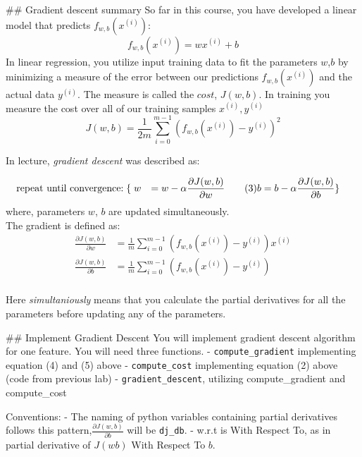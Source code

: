 \documentclass[11pt]{article}
\begin{document}
    \#\# Gradient descent summary So far in this course, you have developed
a linear model that predicts \(f_{w,b}(x^{(i)})\):
\[f_{w,b}(x^{(i)}) = wx^{(i)} + b \tag{1}\] In linear regression, you
utilize input training data to fit the parameters \(w\),\(b\) by
minimizing a measure of the error between our predictions
\(f_{w,b}(x^{(i)})\) and the actual data \(y^{(i)}\). The measure is
called the \(cost\), \(J(w,b)\). In training you measure the cost over
all of our training samples \(x^{(i)},y^{(i)}\)
\[J(w,b) = \frac{1}{2m} \sum\limits_{i = 0}^{m-1} (f_{w,b}(x^{(i)}) - y^{(i)})^2\tag{2}\]

    In lecture, \emph{gradient descent} was described as:

\[\begin{align*} \text{repeat}&\text{ until convergence:} \; \lbrace \newline
\;  w &= w -  \alpha \frac{\partial J(w,b)}{\partial w} \tag{3}  \; \newline 
 b &= b -  \alpha \frac{\partial J(w,b)}{\partial b}  \newline \rbrace
\end{align*}\] where, parameters \(w\), \(b\) are updated
simultaneously.\\
The gradient is defined as: \[
\begin{align}
\frac{\partial J(w,b)}{\partial w}  &= \frac{1}{m} \sum\limits_{i = 0}^{m-1} (f_{w,b}(x^{(i)}) - y^{(i)})x^{(i)} \tag{4}\\
  \frac{\partial J(w,b)}{\partial b}  &= \frac{1}{m} \sum\limits_{i = 0}^{m-1} (f_{w,b}(x^{(i)}) - y^{(i)}) \tag{5}\\
\end{align}
\]

Here \emph{simultaniously} means that you calculate the partial
derivatives for all the parameters before updating any of the
parameters.

    \#\# Implement Gradient Descent You will implement gradient descent
algorithm for one feature. You will need three functions. -
\texttt{compute\_gradient} implementing equation (4) and (5) above -
\texttt{compute\_cost} implementing equation (2) above (code from
previous lab) - \texttt{gradient\_descent}, utilizing compute\_gradient
and compute\_cost

Conventions: - The naming of python variables containing partial
derivatives follows this pattern,\(\frac{\partial J(w,b)}{\partial b}\)
will be \texttt{dj\_db}. - w.r.t is With Respect To, as in partial
derivative of \(J(wb)\) With Respect To \(b\).
\end{document}
